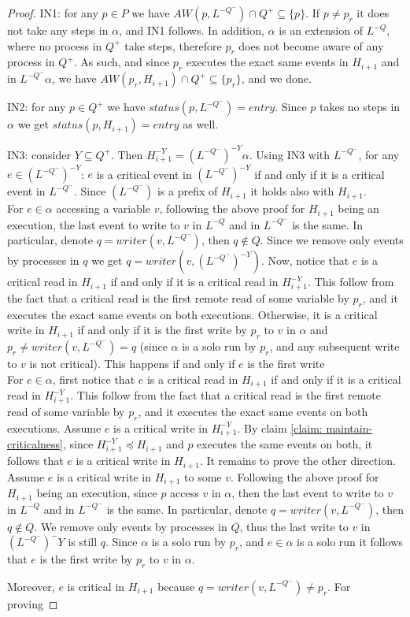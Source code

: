 \begin{proof}
	IN1: for any $p \in P$ we have $AW(p,L^{-Q^-}) \cap Q^+ \subseteq \{p\}$. If $p \neq p_r$ it does not take any steps in $\alpha$, and IN1 follows. In addition, $\alpha$ is an extension of $L^{-Q}$, where no process in $Q^+$ take steps, therefore $p_r$ does not become aware of any process in $Q^+$. As such, and since $p_r$ executes the exact same events in $H_{i+1}$ and in $L^{-Q^-} \alpha$, we have $AW(p_r, H_{i+1}) \cap Q^+ \subseteq \{p_r\}$, and we done.
	
	IN2: for any $p \in Q^+$ we have $status(p,L^{-Q^-}) = entry$. Since $p$ takes no steps in $\alpha$ we get $status(p,H_{i+1}) = entry$ as well.
	
	IN3: consider $Y \subseteq Q^+$. Then $H_{i+1}^{-Y} = (L^{-Q^-})^{-Y} \alpha$.
	Using IN3 with $L^{-Q^-}$, for any $e \in (L^{-Q^-})^{-Y}$: $e$ is a critical event in $(L^{-Q^-})^{-Y}$ if and only if it is a critical event in $L^{-Q^-}$. Since $(L^{-Q^-})$ is a prefix of $H_{i+1}$ it holds also with $H_{i+1}$.
	\\ For $e \in \alpha$ accessing a variable $v$, following the above proof for $H_{i+1}$ being an execution, the last event to write to $v$ in $L^{-Q}$ and in $L^{-Q^-}$ is the same. In particular, denote $q = writer(v,L^{-Q^-})$, then $q \notin Q$. Since we remove only events by processes in $q$ we get $q = writer(v,(L^{-Q^-})^{-Y})$.
	Now, notice that $e$ is a critical read in $H_{i+1}$ if and only if it is a critical read in $H_{i+1}^{-Y}$. This follow from the fact that a critical read is the first remote read of some variable by $p_r$, and it executes the exact same events on both executions.
	Otherwise, it is a critical write in $H_{i+1}$ if and only if it is the first write by $p_r$ to $v$ in $\alpha$ and $p_r \neq writer(v,L^{-Q^-}) = q$ (since $\alpha$ is a solo run by $p_r$, and any subsequent write to $v$ is not critical). This happens if and only if $e$ is the first write 
	\\ For $e \in \alpha$, first notice that $e$ is a critical read in $H_{i+1}$ if and only if it is a critical read in $H_{i+1}^{-Y}$. This follow from the fact that a critical read is the first remote read of some variable by $p_r$, and it executes the exact same events on both executions.
	Assume $e$ is a critical write in $H_{i+1}^{-Y}$. By claim \ref{claim: maintain-criticalness}, since $H_{i+1}^{-Y} \preceq H_{i+1}$ and $p$ executes the same events on both, it follows that $e$ is a critical write in $H_{i+1}$. It remains to prove the other direction.
	Assume $e$ is a critical write in $H_{i+1}$ to some $v$. Following the above proof for $H_{i+1}$ being an execution, since $p$ access $v$ in $\alpha$, then the last event to write to $v$ in $L^{-Q}$ and in $L^{-Q^-}$ is the same. In particular, denote $q = writer(v,L^{-Q^-})$, then $q \notin Q$. We remove only events by processes in $Q$, thus the last write to $v$ in $(L^{-Q^-})^-{Y}$ is still $q$.  Since $\alpha$ is a solo run by $p_r$, and $e \in \alpha$ is a solo run it follows that $e$ is the first write by $p_r$ to $v$ in $\alpha$.
	
	Moreover, $e$ is critical in $H_{i+1}$ because $q = writer(v,L^{-Q^-}) \neq p_r$. For proving 
	
	
\end{proof}
